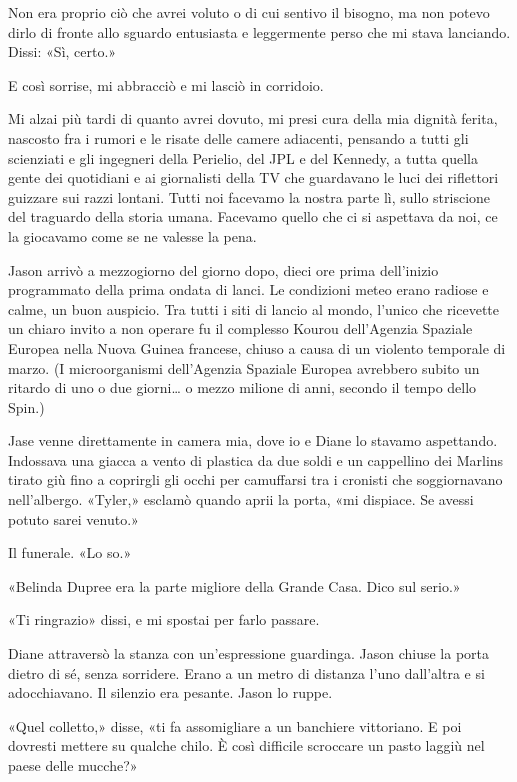 Non era proprio ciò che avrei voluto o di cui sentivo il bisogno, ma non
potevo dirlo di fronte allo sguardo entusiasta e leggermente perso che
mi stava lanciando. Dissi: «Sì, certo.»

E così sorrise, mi abbracciò e mi lasciò in corridoio.

Mi alzai più tardi di quanto avrei dovuto, mi presi cura della mia
dignità ferita, nascosto fra i rumori e le risate delle camere
adiacenti, pensando a tutti gli scienziati e gli ingegneri della
Perielio, del JPL e del Kennedy, a tutta quella gente dei quotidiani e
ai giornalisti della TV che guardavano le luci dei riflettori guizzare
sui razzi lontani. Tutti noi facevamo la nostra parte lì, sullo
striscione del traguardo della storia umana. Facevamo quello che ci si
aspettava da noi, ce la giocavamo come se ne valesse la pena.

\separatorefiori

Jason arrivò a mezzogiorno del giorno dopo, dieci ore prima dell'inizio
programmato della prima ondata di lanci. Le condizioni meteo erano
radiose e calme, un buon auspicio. Tra tutti i siti di lancio al mondo,
l'unico che ricevette un chiaro invito a non operare fu il complesso
Kourou dell'Agenzia Spaziale Europea nella Nuova Guinea francese, chiuso
a causa di un violento temporale di marzo. (I microorganismi
dell'Agenzia Spaziale Europea avrebbero subito un ritardo di uno o due
giorni\ldots{} o mezzo milione di anni, secondo il tempo dello Spin.)

Jase venne direttamente in camera mia, dove io e Diane lo stavamo
aspettando. Indossava una giacca a vento di plastica da due soldi e un
cappellino dei Marlins tirato giù fino a coprirgli gli occhi per
camuffarsi tra i cronisti che soggiornavano nell'albergo. «Tyler,»
esclamò quando aprii la porta, «mi dispiace. Se avessi potuto sarei
venuto.»

Il funerale. «Lo so.»

«Belinda Dupree era la parte migliore della Grande Casa. Dico sul
serio.»

«Ti ringrazio» dissi, e mi spostai per farlo passare.

Diane attraversò la stanza con un'espressione guardinga. Jason chiuse la
porta dietro di sé, senza sorridere. Erano a un metro di distanza l'uno
dall'altra e si adocchiavano. Il silenzio era pesante. Jason lo ruppe.

«Quel colletto,» disse, «ti fa assomigliare a un banchiere vittoriano. E
poi dovresti mettere su qualche chilo. È così difficile scroccare un
pasto laggiù nel paese delle mucche?»

